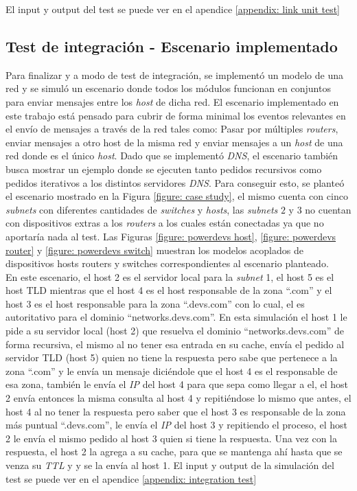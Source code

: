 \documentclass[10pt,a4paper]{article}
\begin{document}
El input y output del test se puede ver en el apendice \ref{appendix: link unit test}

\subsection{Test de integración - Escenario implementado}

Para finalizar y a modo de test de integración, se implementó un modelo de una red y se simuló un escenario donde todos los módulos funcionan en conjuntos para enviar mensajes entre los \textit{host} de dicha red. El escenario implementado en este trabajo está pensado para cubrir de forma minimal los eventos relevantes en el envío de mensajes a través de la red tales como: Pasar por múltiples \textit{routers}, enviar mensajes a otro host de la misma red y enviar mensajes a un \textit{host} de una red donde es el único \textit{host}. Dado que se implementó \textit{DNS}, el escenario también busca mostrar un ejemplo donde se ejecuten tanto pedidos recursivos como pedidos iterativos a los distintos servidores \textit{DNS}. Para conseguir esto, se planteó el escenario mostrado en la Figura \ref{figure: case study}, el mismo cuenta con cinco \textit{subnets} con diferentes cantidades de \textit{switches} y \textit{hosts}, las \textit{subnets} $2$ y $3$ no cuentan con dispositivos extras a los \textit{routers} a los cuales están conectadas ya que no aportaría nada al test. Las Figuras \ref{figure: powerdevs host}, \ref{figure: powerdevs router} y \ref{figure: powerdevs switch} muestran los modelos acoplados de dispositivos hosts routers y switches correspondientes al escenario planteado. \\

En este escenario, el host 2 es el servidor local para la \textit{subnet} 1, el host 5 es el host TLD mientras que el host 4 es el host responsable de la zona ``.com'' y el host 3 es el host responsable para la zona ``.devs.com'' con lo cual, el es autoritativo para el dominio ``networks.devs.com''. En esta simulación el host 1 le pide a su servidor local (host 2) que resuelva el dominio ``networks.devs.com'' de forma recursiva, el mismo al no tener esa entrada en su cache, envía el pedido al servidor TLD (host 5) quien no tiene la respuesta pero sabe que pertenece a la zona ``.com'' y le envía un mensaje diciéndole que el host 4 es el responsable de esa zona, también le envía el \textit{IP} del host 4 para que sepa como llegar a el, el host 2 envía entonces la misma consulta al host 4 y repitiéndose lo mismo que antes, el host 4 al no tener la respuesta pero saber que el host 3 es responsable de la zona más puntual ``.devs.com'', le envía el \textit{IP} del host 3 y repitiendo el proceso, el host 2 le envía el mismo pedido al host 3 quien si tiene la respuesta. Una vez con la respuesta, el host 2 la agrega a su cache, para que se mantenga ahí hasta que se venza su \textit{TTL} y y se la envía al host 1. El input y output de la simulación del test se puede ver en el apendice \ref{appendix: integration test} \\
\end{document}
